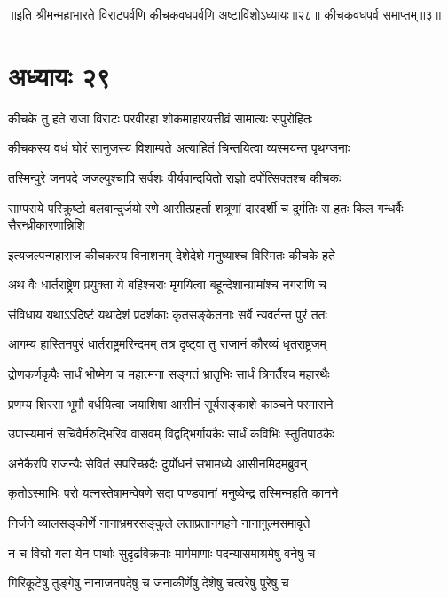 ॥इति श्रीमन्महाभारते विराटपर्वणि कीचकवधपर्वणि अष्टाविंशोऽध्यायः॥२८॥ कीचकवधपर्व समाप्तम्॥३॥

\chapter{अध्यायः २९}

\twolineshloka
{कीचके तु हते राजा विराटः परवीरहा}
{शोकमाहारयत्तीव्रं सामात्यः सपुरोहितः}


\twolineshloka
{कीचकस्य वधं घोरं सानुजस्य विशाम्पते}
{अत्याहितं चिन्तयित्वा व्यस्मयन्त पृथग्जनाः}


\twolineshloka
{तस्मिन्पुरे जनपदे जजल्पुश्चापि सर्वशः}
{वीर्यवान्दयितो राज्ञो दर्पोत्सिक्तश्च कीचकः}


\threelineshloka
{साम्पराये परिक्रुष्टो बलवान्दुर्जयो रणे}
{आसीत्प्रहर्ता शत्रूणां दारदर्शी च दुर्मतिः}
{स हतः किल गन्धर्वैः सैरन्ध्रीकारणान्निशि}


\twolineshloka
{इत्यजल्पन्महाराज कीचकस्य विनाशनम्}
{देशेदेशे मनुष्याश्च विस्मितः कीचके हते}


\twolineshloka
{अथ वैः धार्तराष्ट्रेण प्रयुक्ता ये बहिश्चराः}
{मृगयित्वा बहून्देशान्ग्रामांश्च नगराणि च}


\twolineshloka
{संविधाय यथाऽऽदिष्टं यथादेशं प्रदर्शकाः}
{कृतसङ्केतनाः सर्वे न्यवर्तन्त पुरं ततः}


\twolineshloka
{आगम्य हास्तिनपुरं धार्तराष्ट्रमरिन्दमम्}
{तत्र दृष्ट्वा तु राजानं कौरव्यं धृतराष्ट्रजम्}


\twolineshloka
{द्रोणकर्णकृपैः सार्धं भीष्मेण च महात्मना}
{सङ्गतं भ्रातृभिः सार्धं त्रिगर्तैश्च महारथैः}


\twolineshloka
{प्रणम्य शिरसा भूमौ वर्धयित्वा जयाशिषा}
{आसीनं सूर्यसङ्काशे काञ्चने परमासने}


\twolineshloka
{उपास्यमानं सचिवैर्मरुद्भिरिव वासवम्}
{विद्वद्भिर्गायकैः सार्धं कविभिः स्तुतिपाठकैः}


\twolineshloka
{अनेकैरपि राजन्यैः सेवितं सपरिच्छदैः}
{दुर्योधनं सभामध्ये आसीनमिदमब्रुवन्}


\twolineshloka
{कृतोऽस्माभिः परो यत्नस्तेषामन्वेषणे सदा}
{पाण्डवानां मनुष्येन्द्र तस्मिन्महति कानने}


\twolineshloka
{निर्जने व्यालसङ्कीर्णे नानाभ्रमरसङ्कुले}
{लताप्रतानगहने नानागुल्मसमावृते}


\twolineshloka
{न च विद्मो गता येन पार्थाः सुदृढविक्रमाः}
{मार्गमाणाः पदन्यासमाश्रमेषु वनेषु च}


\twolineshloka
{गिरिकूटेषु तुङ्गेषु नानाजनपदेषु च}
{जनाकीर्णेषु देशेषु चत्वरेषु पुरेषु च}


